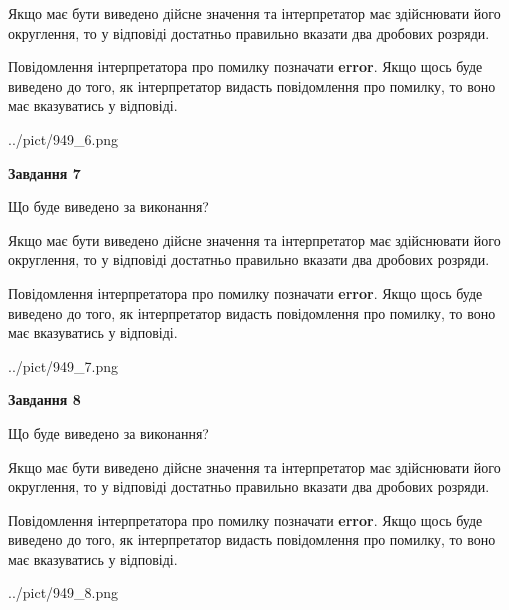 \documentclass[12pt, ukrainian]{article}
\begin{document}
{\begin {Large}
Якщо має бути виведено дійсне значення та інтерпретатор має здійснювати його округлення, 
то у відповіді достатньо правильно вказати два дробових розряди.

Повідомлення інтерпретатора про помилку позначати \textbf{error}.
Якщо щось буде виведено до того, як інтерпретатор видасть повідомлення про помилку, 
то воно має вказуватись у відповіді. \par

\begin{center}
	{../pict/949_6.png}
\end{center}
\newpage

{\begin {center}\textbf{Завдання 7}\end {center}}\par
Що буде виведено за виконання? \par

Якщо має бути виведено дійсне значення та інтерпретатор має здійснювати його округлення, 
то у відповіді достатньо правильно вказати два дробових розряди.

Повідомлення інтерпретатора про помилку позначати \textbf{error}.
Якщо щось буде виведено до того, як інтерпретатор видасть повідомлення про помилку, 
то воно має вказуватись у відповіді. \par

\begin{center}
	{../pict/949_7.png}
\end{center}
\newpage

{\begin {center}\textbf{Завдання 8}\end {center}}\par
Що буде виведено за виконання? \par

Якщо має бути виведено дійсне значення та інтерпретатор має здійснювати його округлення, 
то у відповіді достатньо правильно вказати два дробових розряди.

Повідомлення інтерпретатора про помилку позначати \textbf{error}.
Якщо щось буде виведено до того, як інтерпретатор видасть повідомлення про помилку, 
то воно має вказуватись у відповіді. \par

\begin{center}
	{../pict/949_8.png}
\end{center}
\newpage


\end{Large}}
\end{document}
